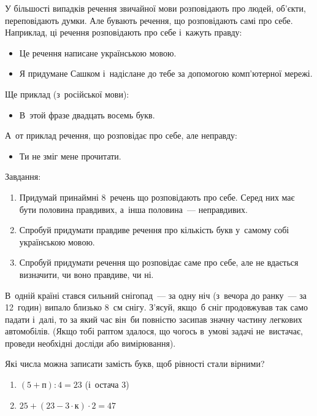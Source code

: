 \problem
У більшості випадків речення звичайної мови розповідають про людей, об'єкти,
переповідають думки.
Але бувають речення, що розповідають самі про себе.
Наприклад, ці речення розповідають про себе і~кажуть правду:
\begin{itemize}
    \item Це речення написане українською мовою.
    \item Я придумане Сашком і~надіслане до тебе
    за допомогою комп’ютерної мережі.
\end{itemize}
Ще приклад (з~російської мови):
\begin{itemize}
    \item В~этой фразе двадцать восемь букв.
\end{itemize}
А~от приклад речення, що розповідає про себе, але неправду:
\begin{itemize}
    \item Ти не зміг мене прочитати.
\end{itemize}
Завдання:
\begin{enumerate}
    \item Придумай принаймні 8~речень що розповідають про себе.
    Серед них має бути половина правдивих, а~інша половина~--- неправдивих.
    \item Спробуй придумати правдиве речення про кількість букв
    у~самому собі українською мовою.
    \item Спробуй придумати речення що розповідає саме про себе,
    але не вдається визначити, чи воно правдиве, чи ні.
\end{enumerate}


\problem
В~одній країні стався сильний снігопад~--- за одну ніч
(з~вечора до ранку~--- за 12~годин) випало близько 8~см снігу.
З'ясуй, якщо~б сніг продовжував так само падати і~далі,
то за який час він~би повністю засипав значну частину легкових автомобілів.
(Якщо тобі раптом здалося, що чогось в~умові задачі не~вистачає,
проведи необхідні досліди або вимірювання).


\problem
Які числа можна записати замість букв, щоб рівності стали вірними?
\begin{enumerate}
    \item $(5 + \textit{п}) : 4 = 23$ (і~остача 3)
    \item $25 + (23 - 3 \cdot \textit{к}) \cdot 2 = 47$
\end{enumerate}


